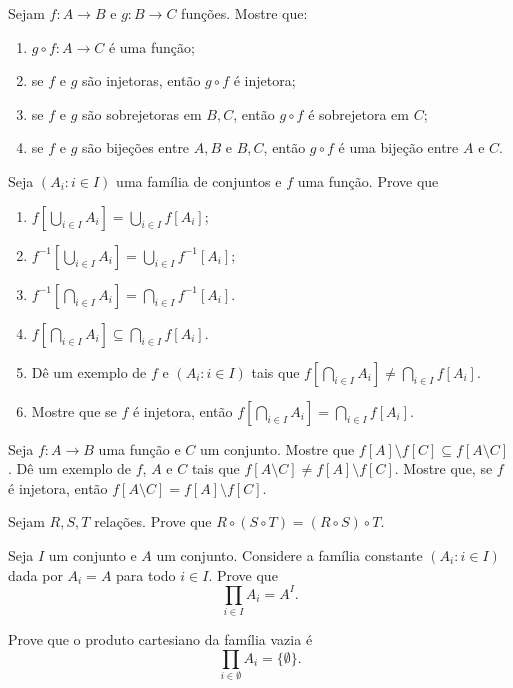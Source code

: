 \begin{exercise}[$\BST$]
    Sejam $f:A\rightarrow B$ e $g:B\rightarrow C$ funções.
    Mostre que:
    \begin{enumerate}[label=(\alph*)]
        \item $g\circ f: A\to C$ é uma função;
        \item se $f$ e $g$ são injetoras, então $g\circ f$ é injetora;
        \item se $f$ e $g$ são sobrejetoras em $B, C$, então $g\circ f$ é sobrejetora em $C$;
        \item se $f$ e $g$ são bijeções entre $A, B$ e $B, C$, então $g\circ f$ é uma bijeção entre $A$ e $C$.
    \end{enumerate}
\end{exercise}

\begin{exercise}[$\BST$]
    Seja $(A_i: i \in I)$ uma família de conjuntos e $f$ uma função.
    Prove que
    \begin{enumerate}[label=(\alph*)]
        \item $f[\bigcup_{i\in I} A_i] = \bigcup_{i\in I} f[A_i]$;
        \item $f^{-1}[\bigcup_{i\in I} A_i] = \bigcup_{i\in I} f^{-1}[A_i]$;
        \item $f^{-1}[\bigcap_{i\in I} A_i] = \bigcap_{i\in I} f^{-1}[A_i]$.
        \item $f[\bigcap_{i\in I} A_i] \subseteq \bigcap_{i\in I} f[A_i]$.
        \item Dê um exemplo de $f$ e $(A_i: i \in I)$ tais que $f[\bigcap_{i\in I} A_i] \neq \bigcap_{i\in I} f[A_i]$.
        \item Mostre que se $f$ é injetora, então $f[\bigcap_{i\in I} A_i] = \bigcap_{i\in I} f[A_i]$.
    \end{enumerate}
\end{exercise}

\begin{exercise}[$\BST$]
    Seja $f:A\to B$ uma função e $C$ um conjunto.
    Mostre que $f[A]\setminus f[C] \subseteq f[A\setminus C]$.
    Dê um exemplo de $f$, $A$ e $C$ tais que $f[A\setminus C] \neq f[A]\setminus f[C]$.
    Mostre que, se $f$ é injetora, então $f[A\setminus C] = f[A]\setminus f[C]$.
\end{exercise}

\begin{exercise}[$\BST$]
    Sejam $R, S, T$ relações.
    Prove que $R\circ (S\circ T) = (R\circ S)\circ T$.
\end{exercise}

\begin{exercise}[$\ZmI$]
    Seja $I$ um conjunto e $A$ um conjunto.
    Considere a família constante $(A_i:i\in I)$ dada por $A_i=A$ para todo $i\in I$.
    Prove que
    \[
        \prod_{i\in I} A_i = A^I.
    \]
\end{exercise}

\begin{exercise}[$\ZmI$]
    Prove que o produto cartesiano da família vazia é
    \[
        \prod_{i\in \emptyset} A_i=\{\emptyset\}.
    \]
\end{exercise}
